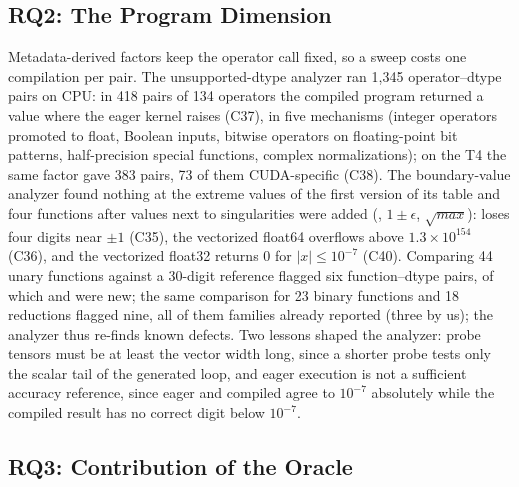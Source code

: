 

\subsection{RQ2: The Program Dimension}
\label{sec:rq2}

Metadata-derived factors keep the operator call fixed, so a sweep costs one compilation per pair. The unsupported-dtype analyzer ran
1{,}345 operator--dtype pairs on CPU: in 418 pairs of 134 operators the compiled program returned a value where
the eager kernel raises  (C37), in five mechanisms (integer operators promoted to
float, Boolean inputs, bitwise operators on floating-point bit patterns, half-precision special functions,
complex normalizations); on the T4 the same factor gave 383 pairs, 73 of them CUDA-specific (C38). The
boundary-value analyzer found nothing at the extreme values of the first version of its table and four
functions after values next to singularities were added (, $1 \pm \epsilon$,
$\sqrt{\mathit{max}}$):  loses four digits near $\pm 1$ (C35), the vectorized float64
 overflows above $1.3\times10^{154}$ (C36), and the vectorized float32  returns 0 for
$|x| \le 10^{-7}$ (C40). Comparing 44 unary functions against a 30-digit reference flagged six function--dtype
pairs, of which  and  were new; the same comparison for 23 binary functions and 18
reductions flagged nine, all of them families already reported (three by us); the analyzer thus re-finds known
defects. Two lessons shaped the analyzer: probe tensors must be at least the vector width long, since a
shorter probe tests only the scalar tail of the generated loop, and eager execution is not a sufficient
accuracy reference, since eager and compiled  agree to $10^{-7}$ absolutely while the compiled
result has no correct digit below $10^{-7}$.


\subsection{RQ3: Contribution of the Oracle}
\label{sec:rq3}


